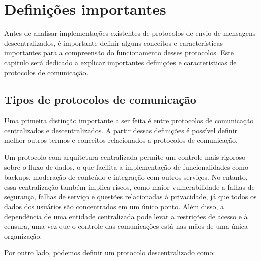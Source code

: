 
\chapter{Definições importantes}

Antes de analisar implementações existentes de protocolos de envio de mensagens descentralizados, é importante definir alguns conceitos e características importantes para a compreensão do funcionamento desses protocolos. Este capitulo será dedicado a explicar importantes definições e características de protocolos de comunicação.

\section{Tipos de protocolos de comunicação}

Uma primeira distinção importante a ser feita é entre protocolos de comunicação centralizados e descentralizados. A partir dessas definições é possível definir melhor outros termos e conceitos relacionados a protocolos de comunicação.


Um protocolo com arquitetura centralizada permite um controle mais rigoroso sobre o fluxo de dados, o que facilita a implementação de funcionalidades como backups, moderação de conteúdo e integração com outros serviços. No entanto, essa centralização também implica riscos, como maior vulnerabilidade a falhas de segurança, falhas de serviço e questões relacionadas à privacidade, já que todos os dados dos usuários são concentrados em um único ponto. Além disso, a dependência de uma entidade centralizada pode levar a restrições de acesso e à censura, uma vez que o controle das comunicações está nas mãos de uma única organização.

Por outro lado, podemos definir um protocolo descentralizado como:

